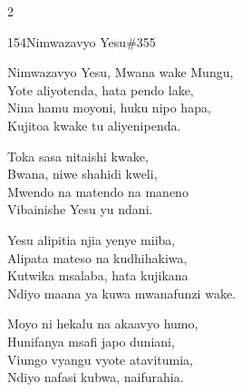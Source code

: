 \documentclass{article}
\begin{document}
\begin{multicols}{2}
\begin{hymn}{154}{Nimwazavyo Yesu}{\#355}
\begin{stanza}
Nimwazavyo Yesu, Mwana wake Mungu,\\
Yote aliyotenda, hata pendo lake,\\
Nina hamu moyoni, huku nipo hapa,\\
Kujitoa kwake tu aliyenipenda.
\end{stanza}
\begin{chorus}
Toka sasa nitaishi kwake,\\
Bwana, niwe shahidi kweli,\\
Mwendo na matendo na maneno\\
Vibainishe Yesu yu ndani.
\end{chorus}
\begin{stanza}
Yesu alipitia njia yenye miiba,\\
Alipata mateso na kudhihakiwa,\\
Kutwika msalaba, hata kujikana\\
Ndiyo maana ya kuwa mwanafunzi wake.
\end{stanza}
\begin{stanza}
Moyo ni hekalu na akaavyo humo,\\
Hunifanya msafi japo duniani,\\
Viungo vyangu vyote atavitumia,\\
Ndiyo nafasi kubwa, naifurahia.
\end{stanza}
\end{hymn}


\end{multicols}
\end{document}
